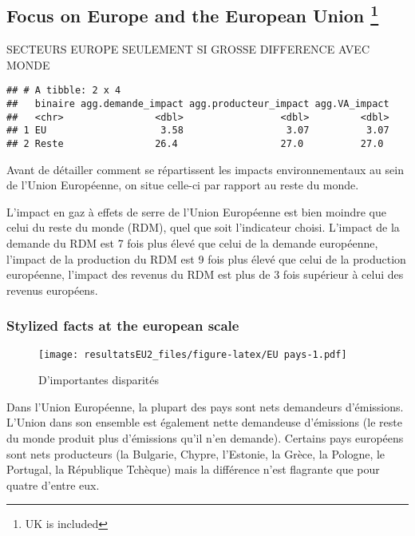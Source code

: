 \documentclass[
]{article}
\begin{document}
{{\hypertarget{focus-on-europe-and-the-european-union}{%
\subsection[Focus on Europe and the European Union
]{\texorpdfstring{Focus on Europe and the European Union
\footnote{UK is included}}{Focus on Europe and the European Union }}\label{focus-on-europe-and-the-european-union}}

SECTEURS EUROPE SEULEMENT SI GROSSE DIFFERENCE AVEC MONDE

\begin{verbatim}
## # A tibble: 2 x 4
##   binaire agg.demande_impact agg.producteur_impact agg.VA_impact
##   <chr>                <dbl>                 <dbl>         <dbl>
## 1 EU                    3.58                  3.07          3.07
## 2 Reste                26.4                  27.0          27.0
\end{verbatim}

Avant de détailler comment se répartissent les impacts environnementaux
au sein de l'Union Européenne, on situe celle-ci par rapport au reste du
monde.

L'impact en gaz à effets de serre de l'Union Européenne est bien moindre
que celui du reste du monde (RDM), quel que soit l'indicateur choisi.
L'impact de la demande du RDM est 7 fois plus élevé que celui de la
demande européenne, l'impact de la production du RDM est 9 fois plus
élevé que celui de la production européenne, l'impact des revenus du RDM
est plus de 3 fois supérieur à celui des revenus européens.

\hypertarget{stylized-facts-at-the-european-scale}{%
\subsubsection{Stylized facts at the european
scale}\label{stylized-facts-at-the-european-scale}}

\begin{figure}
\centering
\texttt{[image: resultatsEU2\_files/figure-latex/EU pays-1.pdf]}
\caption{D'importantes disparités}
\end{figure}

Dans l'Union Européenne, la plupart des pays sont nets demandeurs
d'émissions. L'Union dans son ensemble est également nette demandeuse
d'émissions (le reste du monde produit plus d'émissions qu'il n'en
demande). Certains pays européens sont nets producteurs (la Bulgarie,
Chypre, l'Estonie, la Grèce, la Pologne, le Portugal, la République
Tchèque) mais la différence n'est flagrante que pour quatre d'entre eux.

}}
\end{document}
